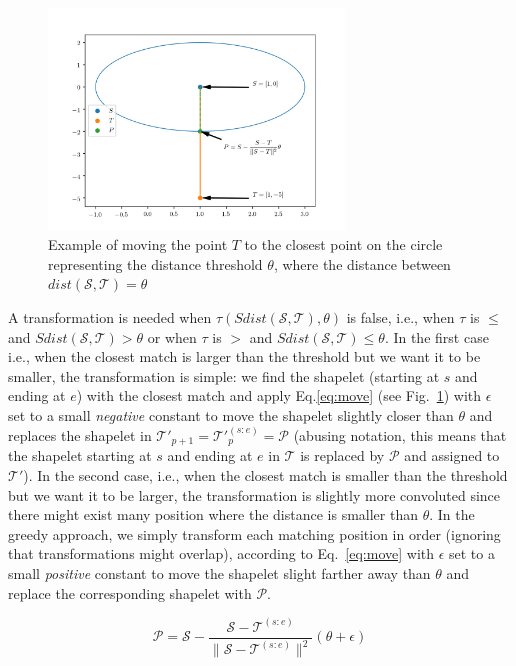 \documentclass[smallextended,natbib]{svjour3}
\begin{document}
\begin{figure}
    \centering
    \includegraphics[width=0.7\textwidth]{example.png}
    \caption{Example of moving the point $T$ to the closest point on the circle representing the distance threshold $\theta$, where the distance between $dist(\mathcal{S}, \mathcal{T}) = \theta$}
    \label{fig:move:example}
\end{figure}

A transformation is needed when $\tau(Sdist(\mathcal{S}, \mathcal{T}), \theta)$ is false, i.e., when $\tau$ is $\leq$ and $Sdist(\mathcal{S}, \mathcal{T}) > \theta$ or when $\tau$ is $>$ and $Sdist(\mathcal{S}, \mathcal{T}) \leq \theta$. In the first case i.e.,  when the closest match is larger than the threshold but we want it to be smaller, the transformation is simple: we find the shapelet (starting at $s$ and ending at $e$) with the closest match and apply Eq.\ref{eq:move} (see Fig.~\ref{fig:move:example}) with $\epsilon$ set to a small \emph{negative} constant to move the shapelet slightly closer than $\theta$ and replaces the shapelet in $\mathcal{T}'_{p+1}=\mathcal{T}'^{(s:e)}_{p} = \mathcal{P}$ (abusing notation, this means that the shapelet starting at $s$ and ending at $e$ in $\mathcal{T}$ is replaced by $\mathcal{P}$ and assigned to $\mathcal{T}'$). In the second case, i.e., when the closest match is smaller than the threshold but we want it to be larger, the transformation is slightly more convoluted since there might exist many position where the distance is smaller than $\theta$. In the greedy approach, we simply transform each matching position in order (ignoring that transformations might overlap), according to Eq.~\ref{eq:move} with $\epsilon$ set to a small \emph{positive} constant to move the shapelet slight farther away than $\theta$ and replace the corresponding shapelet with $\mathcal{P}$.

\begin{equation}
 \mathcal{P} = \mathcal{S} - \frac{\mathcal{S} - \mathcal{T}^{(s:e)}}{\lVert \mathcal{S} - \mathcal{T}^{(s:e)} \rVert^2}(\theta+\epsilon)
 \label{eq:move}
\end{equation}
\end{document}
